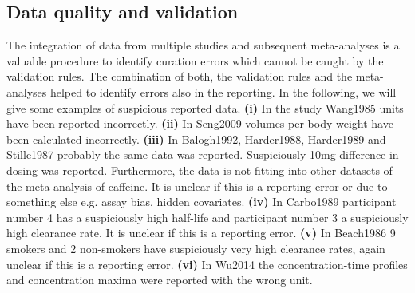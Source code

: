 \documentclass[a4,center,fleqn]{NAR}
\begin{document}
\subsection{Data quality and validation}
The integration of data from multiple studies and subsequent meta-analyses is a valuable procedure to identify curation errors which cannot be caught by the validation rules. The combination of both, the validation rules and the meta-analyses helped to identify errors also in the reporting. In the following, we will give some examples of suspicious reported data. 
\textbf{(i)} In the study Wang1985 \cite{Wang1985} units have been reported incorrectly. 
\textbf{(ii)} In Seng2009 \cite{Seng2009} volumes per body weight have been calculated incorrectly. 
\textbf{(iii)} In Balogh1992, Harder1988, Harder1989 and Stille1987 \cite{Stille1987,Harder1988, Harder1989,Balogh1992} probably the same data was reported. Suspiciously 10mg difference in dosing was reported. Furthermore, the data is not fitting into other datasets of the meta-analysis of caffeine. It is unclear if this is a reporting error or due to something else e.g. assay bias, hidden covariates.
\textbf{(iv)} In Carbo1989 \cite{Carbo1989} participant number 4 has a suspiciously high half-life and participant number 3 a suspiciously high clearance rate. It is unclear if this is a reporting error.
\textbf{(v)} In Beach1986 \cite{Beach1986} 9 smokers and 2 non-smokers have suspiciously very high clearance rates, again unclear if this is a reporting error. 
\textbf{(vi)} In Wu2014 \cite{Wu2014} the concentration-time profiles and concentration maxima were reported with the wrong unit.
\end{document}
